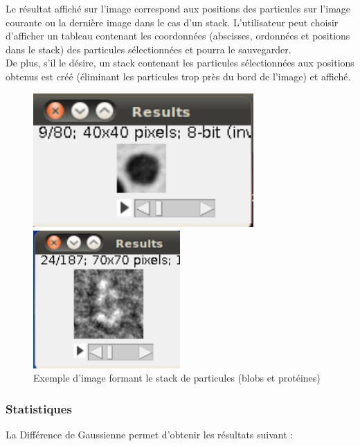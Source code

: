 Le résultat affiché sur l'image correspond aux positions des particules sur l'image courante ou la dernière image dans le cas d'un stack.
L'utilisateur peut choisir d'afficher un tableau contenant les coordonnées (abscisses, ordonnées et positions dans le stack) des particules sélectionnées et pourra le sauvegarder. \\
De plus, s'il le désire, un stack contenant les particules sélectionnées aux positions obtenus est créé (éliminant les particules trop près du bord de l'image) et affiché.
\begin{figure}[ht]
 \begin{minipage}{.450\linewidth}
  \includegraphics[width=0.75\textwidth]{cropblob.png}  
 \end{minipage} \hfill
\begin{minipage}{.450\linewidth}
  \includegraphics[width=0.5\textwidth]{cropprotDog.png}   
 \end{minipage} \hfill
\caption{Exemple d'image formant le stack de particules (blobs et protéines)}
\end{figure}
\subsubsection*{Statistiques}
La Différence de Gaussienne permet d'obtenir les résultats suivant :

